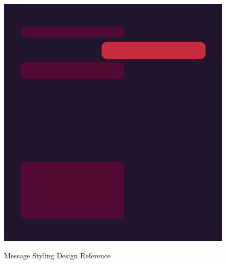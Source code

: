 \begin{figure}[ht]
    \caption{Message Styling Design Reference}
    \includegraphics[width=1.0\textwidth]{./graphics/messages}\label{fig:figure2}
\end{figure}

